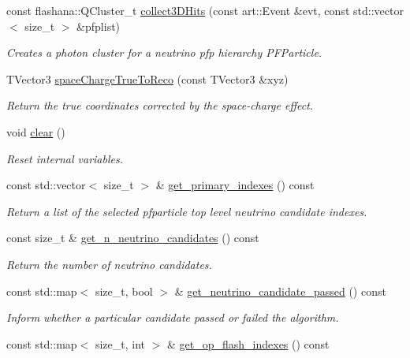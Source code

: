 \begin{DoxyCompactItemize}
const flashana\-::\-Q\-Cluster\-\_\-t \hyperlink{group__lee_ga06a3e470d9b2ca729d25822fac19e455}{collect3\-D\-Hits} (const art\-::\-Event \&evt, const std\-::vector$<$ size\-\_\-t $>$ \&pfplist)
\begin{DoxyCompactList}\small\item\em Creates a photon cluster for a neutrino pfp hierarchy P\-F\-Particle. \end{DoxyCompactList}\item 
T\-Vector3 \hyperlink{group__lee_gafb99143e1546158d3f030724694e6a51}{space\-Charge\-True\-To\-Reco} (const T\-Vector3 \&xyz)
\begin{DoxyCompactList}\small\item\em Return the true coordinates corrected by the space-\/charge effect. \end{DoxyCompactList}\item 
\hypertarget{group__lee_gad936812d5e9dc7999a37c75b84b04ada}{void \hyperlink{group__lee_gad936812d5e9dc7999a37c75b84b04ada}{clear} ()}\label{group__lee_gad936812d5e9dc7999a37c75b84b04ada}

\begin{DoxyCompactList}\small\item\em Reset internal variables. \end{DoxyCompactList}\item 
\hypertarget{group__lee_ga317c107f710fc965cd7e062ac933d3df}{const std\-::vector$<$ size\-\_\-t $>$ \& \hyperlink{group__lee_ga317c107f710fc965cd7e062ac933d3df}{get\-\_\-primary\-\_\-indexes} () const }\label{group__lee_ga317c107f710fc965cd7e062ac933d3df}

\begin{DoxyCompactList}\small\item\em Return a list of the selected pfparticle top level neutrino candidate indexes. \end{DoxyCompactList}\item 
\hypertarget{group__lee_ga6259851e755db48eb0dd831708212e27}{const size\-\_\-t \& \hyperlink{group__lee_ga6259851e755db48eb0dd831708212e27}{get\-\_\-n\-\_\-neutrino\-\_\-candidates} () const }\label{group__lee_ga6259851e755db48eb0dd831708212e27}

\begin{DoxyCompactList}\small\item\em Return the number of neutrino candidates. \end{DoxyCompactList}\item 
const std\-::map$<$ size\-\_\-t, bool $>$ \& \hyperlink{group__lee_gab34dc2b97e0065b07a5233e3b46b83a4}{get\-\_\-neutrino\-\_\-candidate\-\_\-passed} () const 
\begin{DoxyCompactList}\small\item\em Inform whether a particular candidate passed or failed the algorithm. \end{DoxyCompactList}\item 
\hypertarget{group__lee_gaffda5b411008752c1355a9dd3a1d9c1e}{const std\-::map$<$ size\-\_\-t, int $>$ \& \hyperlink{group__lee_gaffda5b411008752c1355a9dd3a1d9c1e}{get\-\_\-op\-\_\-flash\-\_\-indexes} () const }\label{group__lee_gaffda5b411008752c1355a9dd3a1d9c1e}


\end{DoxyCompactItemize}

